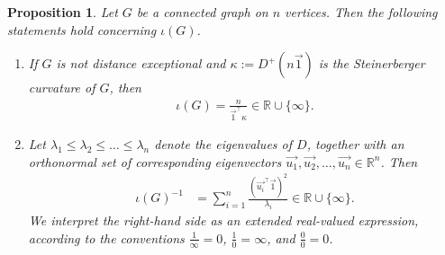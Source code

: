 \documentclass[11pt,a4paper]{article}
\newcommand{\distmatrix}{D}
\newcommand{\one}{\vec{1}}
\newtheorem{proposition}[theorem]{Proposition}
\begin{document}
    \begin{proposition}\label{prop:representations-of-index}
        Let $G$ be a connected graph on $n$ vertices. Then the following statements hold concerning $\iota(G)$.
            \begin{enumerate}[label=\emph{(\roman*)}]
                \item If $G$ is not distance exceptional and $\kappa := \distmatrix^+ (n\one)$ is the Steinerberger curvature of $G$, then
                    \begin{align}\label{eq:beta-reciprocal}
                        \iota(G) = \frac{n}{\one^\top \kappa} \in \mathbb{R}\cup\{\infty\}.
                    \end{align}
                \item Let $\lambda_1\leq\lambda_2\leq\dotsc\leq\lambda_n$ denote the eigenvalues of $\distmatrix$, together with an orthonormal set of corresponding eigenvectors $\vec{u_1}, \vec{u_2},\dotsc, \vec{u_n}\in\mathbb{R}^n$. Then
                    \begin{align}\label{eq:beta-reciprocal2}
                        \iota(G)^{-1} &= \sum_{i=1}^{n} \frac{(\vec{u_i}^\top \one)^2}{\lambda_i} \in  \mathbb{R}\cup\{\infty\}.
                    \end{align}
                We interpret the right-hand side as an extended real-valued expression, according to the conventions $\frac1\infty =0$, $\frac10 = \infty$, and $\frac00= 0$.
            \end{enumerate}
    \end{proposition}
\end{document}

